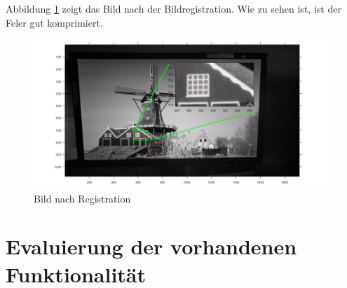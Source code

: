 Abbildung \ref{fig:Bild nach Registration} zeigt das Bild nach der Bildregistration. Wie zu sehen ist, ist der Feler gut komprimiert.
\begin{figure}[H]
 \centering 
  \includegraphics[keepaspectratio,width=1.05\textwidth]{images/5_Implementirung/nachregis.pdf}
 \caption{Bild nach Registration}
 \label{fig:Bild nach Registration}
\end{figure}


\section{Evaluierung der vorhandenen Funktionalität}
